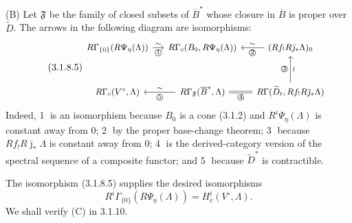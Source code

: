 \medskip
\noindent\textup{(B)}
Let $\mathfrak F$ be the family of closed subsets of $\overline B^*$
whose closure in $\overline B$ is proper over $\widetilde D$.  The
arrows in the following diagram are isomorphisms:
\begin{equation}\tag{3.1.8.5}
\begin{tikzcd}[column sep=small,row sep=large,cells={nodes={font=\small}}]
R\Gamma_{\{0\}}(R\Psi_\eta(\Lambda))
  \arrow[r,"\sim","\text{\textcircled{1}}"']
  & R\Gamma_c(B_0,R\Psi_\eta(\Lambda))
  & (Rf_!R\bar\jmath_*\Lambda)_0
      \arrow[l,"\sim"',"\text{\textcircled{2}}"] \\
R\Gamma_c(V^\circ,\Lambda)
  & R\Gamma_{\mathfrak F}(\overline B^*,\Lambda)
      \arrow[l,"\sim"',"\text{\textcircled{5}}"]
      \arrow[r,equal,"\text{\textcircled{4}}"']
  & R\Gamma(\widetilde D_t,Rf_!R\bar\jmath_*\Lambda)
      \arrow[u,"\text{\textcircled{3}}","\wr"']
\end{tikzcd}
\end{equation}
Indeed, \textcircled{1} is an isomorphism because $B_0$ is a cone
(3.1.2) and $R^i\Psi_\eta(\Lambda)$ is constant away from $0$;
\textcircled{2} by the proper base-change theorem;
\textcircled{3} because $Rf_!R\bar\jmath_*\Lambda$ is constant away
from $0$; \textcircled{4} is the derived-category version of the
spectral sequence of a composite functor; and \textcircled{5} because
$\widetilde D^*$ is contractible.

The isomorphism (3.1.8.5) supplies the desired isomorphisms
\begin{equation}\tag{3.1.8.6}
R^i\Gamma_{\{0\}}(R\Psi_\eta(\Lambda))
=H_c^i(V^\circ,\Lambda).
\end{equation}
We shall verify (C) in 3.1.10.

